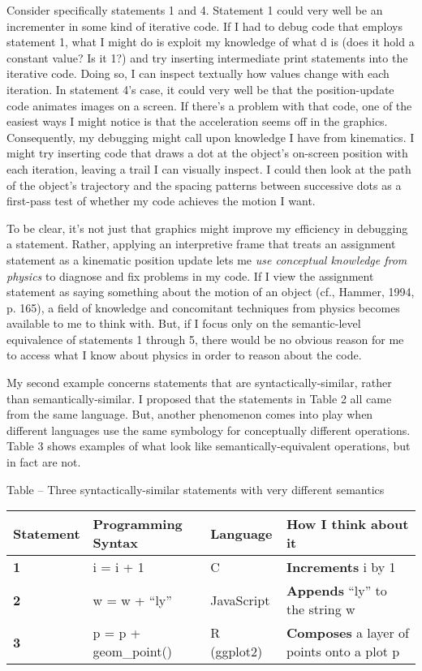 Consider specifically statements 1 and 4. Statement 1 could very well be
an incrementer in some kind of iterative code. If I had to debug code
that employs statement 1, what I might do is exploit my knowledge of
what d is (does it hold a constant value? Is it 1?) and try inserting
intermediate print statements into the iterative code. Doing so, I can
inspect textually how values change with each iteration. In statement
4's case, it could very well be that the position-update code animates
images on a screen. If there's a problem with that code, one of the
easiest ways I might notice is that the acceleration seems off in the
graphics. Consequently, my debugging might call upon knowledge I have
from kinematics. I might try inserting code that draws a dot at the
object's on-screen position with each iteration, leaving a trail I can
visually inspect. I could then look at the path of the object's
trajectory and the spacing patterns between successive dots as a
first-pass test of whether my code achieves the motion I want.

To be clear, it's not just that graphics might improve my efficiency in
debugging a statement. Rather, applying an interpretive frame that
treats an assignment statement as a kinematic position update lets me
\emph{use conceptual knowledge from physics} to diagnose and fix
problems in my code. If I view the assignment statement as saying
something about the motion of an object (cf., Hammer, 1994, p. 165), a
field of knowledge and concomitant techniques from physics becomes
available to me to think with. But, if I focus only on the
semantic-level equivalence of statements 1 through 5, there would be no
obvious reason for me to access what I know about physics in order to
reason about the code.

My second example concerns statements that are syntactically-similar,
rather than semantically-similar. I proposed that the statements in
Table 2 all came from the same language. But, another phenomenon comes
into play when different languages use the same symbology for
conceptually different operations. Table 3 shows examples of what look
like semantically-equivalent operations, but in fact are not.

\protect\hypertarget{ux5fToc252445957}{}{}Table -- Three
syntactically-similar statements with very different semantics

\begin{longtable}[]{@{}llll@{}}
\toprule
\textbf{Statement } & Programming Syntax & Language & How I think about
it\tabularnewline
\midrule
\endhead
\textbf{1} & i = i + 1 & C & \textbf{Increments} i by 1\tabularnewline
\textbf{2} & w = w + ``ly'' & JavaScript & \textbf{Appends} ``ly'' to
the string w\tabularnewline
\textbf{3} & p = p + geom\_point() & R (ggplot2) & \textbf{Composes} a
layer of points onto a plot p\tabularnewline
\bottomrule
\end{longtable}

